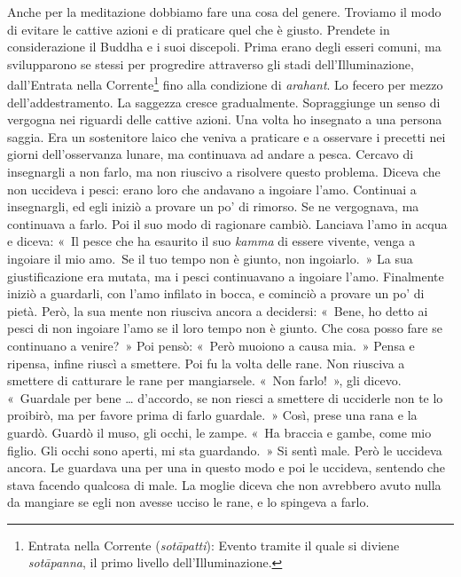 Anche per la meditazione dobbiamo fare una cosa del genere. Troviamo il
modo di evitare le cattive azioni e di praticare quel che è giusto.
Prendete in considerazione il Buddha e i suoi discepoli. Prima erano
degli esseri comuni, ma svilupparono se stessi per progredire attraverso
gli stadi dell'Illuminazione, dall'Entrata nella Corrente\footnote{Entrata
  nella Corrente (\emph{sotāpatti}): Evento tramite il quale si diviene
  \emph{sotāpanna}, il primo livello dell'Illuminazione.} fino alla
condizione di \emph{arahant}. Lo fecero per mezzo dell'addestramento.
La saggezza cresce gradualmente. Sopraggiunge un senso di vergogna nei
riguardi delle cattive azioni. Una volta ho insegnato a una persona
saggia. Era un sostenitore laico che veniva a praticare e a osservare i
precetti nei giorni dell'osservanza lunare, ma continuava ad andare a
pesca. Cercavo di insegnargli a non farlo, ma non riuscivo a risolvere
questo problema. Diceva che non uccideva i pesci: erano loro che
andavano a ingoiare l'amo. Continuai a insegnargli, ed egli iniziò a
provare un po' di rimorso. Se ne vergognava, ma continuava a farlo. Poi
il suo modo di ragionare cambiò. Lanciava l'amo in acqua e diceva: «~Il
pesce che ha esaurito il suo \emph{kamma} di essere vivente, venga a
ingoiare il mio amo.~Se il tuo tempo non è giunto, non ingoiarlo.~» La
sua giustificazione era mutata, ma i pesci continuavano a ingoiare
l'amo. Finalmente iniziò a guardarli, con l'amo infilato in bocca, e
cominciò a provare un po' di pietà. Però, la sua mente non riusciva
ancora a decidersi: «~Bene, ho detto ai pesci di non ingoiare l'amo se
il loro tempo non è giunto. Che cosa posso fare se continuano a
venire?~» Poi pensò: «~Però muoiono a causa mia.~» Pensa e ripensa,
infine riuscì a smettere. Poi fu la volta delle rane. Non riusciva a
smettere di catturare le rane per mangiarsele. «~Non farlo!~», gli
dicevo. «~Guardale per bene \ldots{} d'accordo, se non riesci a smettere di
ucciderle non te lo proibirò, ma per favore prima di farlo guardale.~»
Così, prese una rana e la guardò. Guardò il muso, gli occhi, le zampe.
«~Ha braccia e gambe, come mio figlio. Gli occhi sono aperti, mi sta
guardando.~» Si sentì male. Però le uccideva ancora. Le guardava una per
una in questo modo e poi le uccideva, sentendo che stava facendo
qualcosa di male. La moglie diceva che non avrebbero avuto nulla da
mangiare se egli non avesse ucciso le rane, e lo spingeva a farlo.

